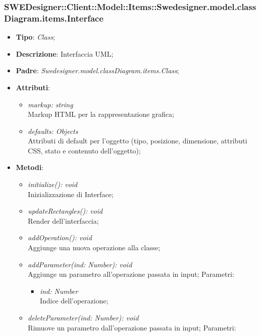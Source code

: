 \documentclass[../DefinizioneDiProdotto.tex]{subfiles}
\begin{document}
			\subsubsection{SWEDesigner::Client::Model::Items::Swedesigner.model.classDiagram.items.Interface}
			\hypertarget{SWEDesigner::Client::Model::Items::Swedesigner.model.classDiagram.items.Interface}{}
			\begin{itemize}
				\item \textbf{Tipo}: \emph{Class};
				\item \textbf{Descrizione}: Interfaccia UML;
				\item \textbf{Padre}: \emph{Swedesigner.model.classDiagram.items.Class};
				\item \textbf{Attributi}:
				\begin{itemize}
					\item \emph{markup: string}\\
					Markup HTML per la rappresentazione grafica;
					\item \emph{defaults: Objects}\\
					Attributi di default per l'oggetto (tipo, posizione, dimensione, attributi CSS, stato e contenuto dell'oggetto);
				\end{itemize}
				\item \textbf{Metodi}:
				\begin{itemize}
					\item \emph{initialize(): void}\\
					Inizializzazione di Interface;
					\item \emph{updateRectangles(): void}\\
					Render dell'interfaccia;
					\item \emph{addOperation(): void}\\
					Aggiunge una nuova operazione alla classe;	
					\item \emph{addParameter(ind: Number): void}\\
					Aggiunge un parametro all'operazione passata in input;
					Parametri:
					\begin{itemize}
						\item \emph{ind: Number} \\
						Indice dell'operazione;
					\end{itemize}
					\item \emph{deleteParameter(ind: Number): void}\\
					Rimuove un parametro dall'operazione passata in input;
					Parametri:
					\begin{itemize}

\end{itemize}
\end{itemize}
\end{itemize}
\end{document}
